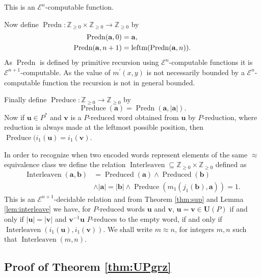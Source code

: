 \documentclass[a4paper]{article}
\newcommand{\grz}[1]{$\mathcal{E}^{#1}$}	%
\newcommand{\ZZ}{\mathbb{Z}}
\newcommand{\maps}{\longrightarrow}
\newcommand{\avec}{\mathbf{a}}	%
\newcommand{\bvec}{\mathbf{b}}	%
\newcommand{\uvec}{\mathbf{u}}	%
\newcommand{\vvec}{\mathbf{v}}	%
\newcommand{\Uvec}{\mathbf{U}}	%
\newcommand{\UP}{\Uvec(P)}
\newcommand{\Preduced}{\operatorname{Preduced}}
\newcommand{\leftm}{\operatorname{leftm}}
\newcommand{\Predn}{\operatorname{Predn}}
\newcommand{\Preduce}{\operatorname{Preduce}}
\newcommand{\Interleaven}{\operatorname{Interleaven}}
\theoremstyle{plain}
\theoremstyle{definition}
\begin{document}
This is an \grz{n}-computable function. 

Now define $\Predn:\ZZ_{\geq 0}\times \ZZ_{\geq 0} \maps \ZZ_{\geq 0}$ by
\begin{align}
\Predn(\avec,0) & = \avec,\notag\\
\Predn(\avec, n+1) & = \leftm(\Predn(\avec,n))\label{eq:Pr}.
\end{align} 
As $\Predn$ is defined by primitive recursion using \grz{n}-computable functions it
is \grz{n+1}-computable. As the value of $m^\prime(x,y)$ is not necessarily bounded by
a \grz{n}-computable function the recursion is not in general bounded.

Finally define $\Preduce:\ZZ_{\geq 0}\maps \ZZ_{\geq 0}$ by
\begin{equation}\label{eq:Preduce}
\Preduce(\avec)=\Predn(\avec,|\avec|).
\end{equation}
Now if $\uvec \in P^\ast$ and $\vvec$ is a $P$-reduced word 
obtained from $\uvec$ by $P$-reduction, where reduction is always made 
at the leftmost possible position, then $\Preduce(i_1(\uvec)=i_1(\vvec)$. 

In order to recognize when two encoded words represent elements of the same
$\approx$ equivalence class we define the relation $\Interleaven\subseteq \ZZ_{\geq 0}\times \ZZ_{\geq 0}$ 
defined as 
\begin{equation}\label{eq:interleaven}
\begin{split}
\Interleaven(\avec,\bvec) &=\Preduced(\avec)\wedge \Preduced(\bvec) \\ 
&\wedge |\avec|=|\bvec|
\wedge \Preduce(m_1(j_1(\bvec),\avec))=1.
\end{split}
\end{equation}
This is an \grz{n+1}-decidable relation and from Theorem \ref{thm:sup} and Lemma \ref{lem:interleave} we have,
for $P$-reduced words $\uvec$ and $\vvec$, 
$\uvec=\vvec\in \UP$ if and only if  $|\uvec|=|\vvec|$ and $\vvec^{-1}\uvec$ $P$-reduces to the
empty word,  if and only if $\Interleaven(i_1(\uvec),i_1(\vvec))$.  
We shall write $m\approx n$, for integers $m,n$ such that $\Interleaven(m,n)$. 
\subsection{Proof of Theorem \ref{thm:UPgrz}}
\end{document}
